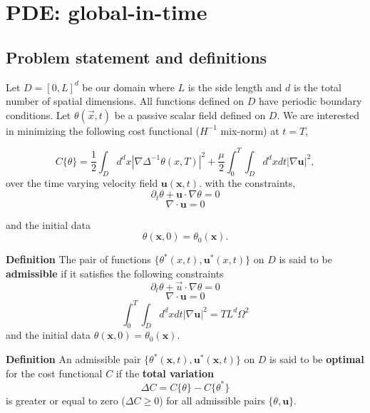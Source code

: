 \documentclass[11pt]{article}
\begin{document}
\section{PDE: global-in-time}

\subsection{Problem statement and definitions}
Let $D=[0,L]^{d}$ be our domain where $L$ is the side length and $d$ is the total number of spatial dimensions. All functions defined on $D$ have periodic boundary conditions. Let $\theta (\vec{x},t)$ be a passive scalar field defined on $D$. We are interested in minimizing the following cost functional ($H^{-1}$ mix-norm) at $t=T$,

\begin{equation}
\label{eq:cost}
C\{\theta\}=\frac{1}{2}\int_{D}d^{d}x |\nabla\Delta^{-1} \theta(x,T)|^{2}+\frac{\mu}{2}\int_{0}^{T}\int_{D}d^{d}xdt |\nabla \mathbf{u}|^{2},
\end{equation}
over the time varying velocity field $\mathbf{u}(\mathbf{x},t)$. with the constraints, 
\begin{equation}
	\label{eq:advection2}
	\partial_{t}\theta+\mathbf{u}\cdot \nabla \theta=0
\end{equation}
\begin{equation}
	\label{eq:divfree2}
	\nabla\cdot \mathbf{u}=0
\end{equation}

	 and the initial data 
\begin{equation}
	 \theta(\mathbf{x},0)=\theta_{0}(\mathbf{x}).
\end{equation}
\vspace{1cm}

\noindent \textbf{Definition} The pair of functions $\{\theta^{*}(x,t), \mathbf{u}^{*}(x,t)\}$ on $D$ is said to be \textbf{admissible} if it satisfies the following constraints \[\partial_{t}\theta+\vec{u}\cdot \nabla \theta=0\]
\[\nabla\cdot \mathbf{u}=0\]
\[\int_{0}^{T}\int_{D}d^{d}xdt |\nabla \mathbf{u}|^{2}=TL^{d}\Omega^{2}\] and the initial data $\theta(\mathbf{x},0)=\theta_{0}(\mathbf{x})$.

\vspace{1cm}

\noindent \textbf{Definition} An admissible pair $\{\theta^{*}(\mathbf{x},t), \mathbf{u}^{*}(\mathbf{x},t)\}$ on $D$ is said to be \textbf{optimal} for the cost functional $C$ if the \textbf{total variation}
\[\Delta C=C\{\theta\}-C\{\theta^{*}\} \] is greater or equal to zero ($\Delta C\geq0$) for all admissible pairs $\{\theta,\mathbf{u}\}$.
\end{document}
